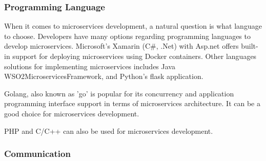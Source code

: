 \subsubsection{Programming Language}
When it comes to microservices development, a natural question is what language to choose. Developers have many options regarding programming languages to develop microservices. Microsoft's Xamarin (C\#, .Net) with Asp.net offers built-in support for deploying microservices using Docker containers.\cite{Johansson2019, liu2018, Falatiuk2019, chauvel2018, haugeland2020, neves2019} Other languages solutions for implementing microservices includes Java WSO2MicroservicesFramework,\cite{Venugopal2017, khan2020, Sharaf2019, KalskeM2017} and Python's flask application.\cite{Ghebremicael2017, khan2020, Hou2020}





Golang, also known as 'go' is popular for its concurrency and application programming interface support in terms of microservices architecture. It can be a good choice for microservices development.\cite{liu2018}

PHP\cite{McElhiney2018} and C/C++\cite{Ghebremicael2017} can also be used for microservices development.



\subsubsection{Communication}

